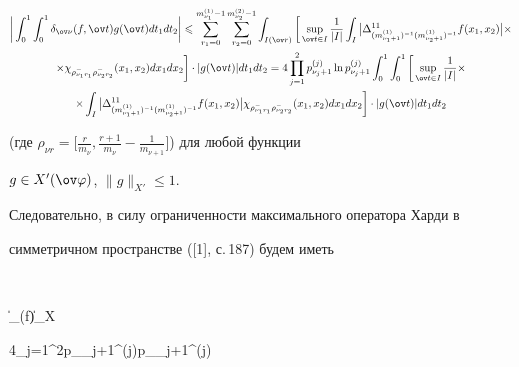 \begin{multline*}


\bigg|\int_{0}^{1} \int_{0}^{1}\delta_{\ov \nu}(f,\ov t)g(\ov 


t)dt_{1}dt_{2}\bigg|\leq


\sum_{r_{1}=0}^{m_{\nu_{1}}^{(1)}-1}


\sum_{r_{2}=0}^{m_{\nu_{2}}^{(2)}-1}\int_{I(\ov r)}\bigg[\sup_{\ov t\in 


I} \frac{1}{|I|}\int_{I}\big| 


\Delta_{(m_{\nu_{1}+1}^{(1)})^{-1}(m_{\nu_{2}+1}^{(1)})^{-1}}^{11} 


f(x_{1},x_{2})\big|\times\\


%


\times\chi_{\rho_{\nu_{1}r_{1}}^{-}\rho_{\nu_{2}r_{2}}^{-}}(x_{1},x_{2}) 


dx_{1}dx_{2}\bigg]\cdot |g(\ov t)|dt_{1}dt_{2}=


4\prod_{j=1}^{2}p_{\nu_{j}+1}^{(j)} \ln p_{\nu_{j}+1}^{(j)}\int_{0}^{1} 


\int_{0}^{1}\bigg[\sup_{\ov t\in 


I} \frac{1}{|I|}\times \\


%


\times\int_{I}\big| 


\Delta_{(m_{\nu_{1}+1}^{(1)})^{-1}(m_{\nu_{2}+1}^{(1)})^{-1}}^{11} 


f(x_{1},x_{2})\big|\chi_{\rho_{\nu_{1}r_{1}}^{-}\rho_{\nu_{2}r_{2}}^{-}}


(x_{1},x_{2}) dx_{1}dx_{2}\bigg]\cdot |g(\ov t)|dt_{1}dt_{2}


\end{multline*}


(где $\rho_{\nu r}= \big[\frac{r}{m_{\nu}}, 


\frac{r+1}{m_{\nu}}-\frac{1}{m_{\nu+1}}\big]$) для любой функции 


$g\in X'(\ov \varphi)$, $\|g\|_{X'}\leq 1$.





Следовательно, в силу ограниченности максимального оператора Харди в 


симметричном пространстве ([1], с.\,187) будем иметь


$$


\|\delta_{\ov\nu}(f)\|_{X}\leq 


4\prod_{j=1}^{2}p_{\nu_{j}+1}^{(j)}\ln p_{\nu_{j}+1}^{(j)}\cdot


